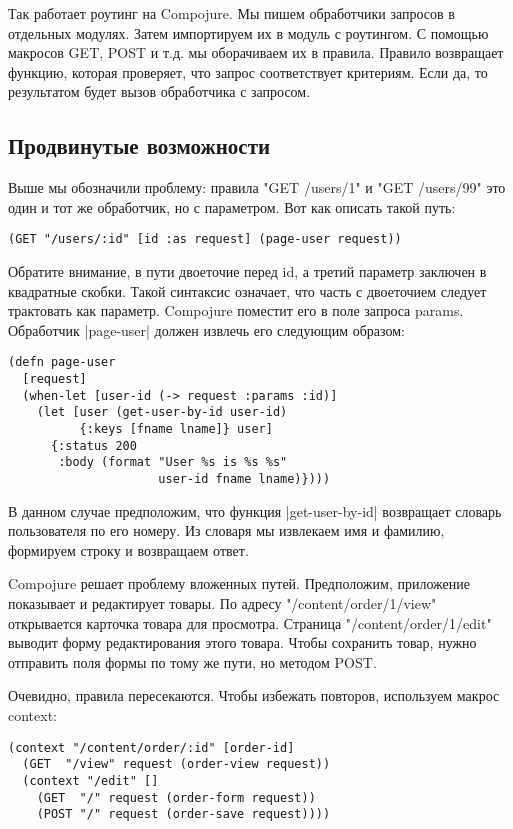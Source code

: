 Так работает роутинг на Compojure. Мы пишем обработчики запросов в отдельных
модулях. Затем импортируем их в модуль с роутингом. С помощью макросов GET, POST
и т.д. мы оборачиваем их в правила. Правило возвращает функцию, которая
проверяет, что запрос соответствует критериям. Если да, то результатом будет
вызов обработчика с запросом.

\subsection{Продвинутые возможности}

Выше мы обозначили проблему: правила "GET /users/1" и "GET /users/99" это один и
тот же обработчик, но с параметром. Вот как описать такой путь:

\begin{verbatim}
(GET "/users/:id" [id :as request] (page-user request))
\end{verbatim}

Обратите внимание, в пути двоеточие перед id, а третий параметр заключен в
квадратные скобки. Такой синтаксис означает, что часть с двоеточием следует
трактовать как параметр. Compojure поместит его в поле запроса
params. Обработчик \spverb|page-user| должен извлечь его следующим образом:

\begin{verbatim}
(defn page-user
  [request]
  (when-let [user-id (-> request :params :id)]
    (let [user (get-user-by-id user-id)
          {:keys [fname lname]} user]
      {:status 200
       :body (format "User %s is %s %s"
                     user-id fname lname)})))
\end{verbatim}

В данном случае предположим, что функция \spverb|get-user-by-id| возвращает словарь
пользователя по его номеру. Из словаря мы извлекаем имя и фамилию, формируем
строку и возвращаем ответ.

Compojure решает проблему вложенных путей. Предположим, приложение показывает и
редактирует товары. По адресу "/content/order/1/view" открывается карточка
товара для просмотра. Страница "/content/order/1/edit" выводит форму
редактирования этого товара. Чтобы сохранить товар, нужно отправить поля формы
по тому же пути, но методом POST.

Очевидно, правила пересекаются. Чтобы избежать повторов, используем макрос context:

\begin{verbatim}
(context "/content/order/:id" [order-id]
  (GET  "/view" request (order-view request))
  (context "/edit" []
    (GET  "/" request (order-form request))
    (POST "/" request (order-save request))))
\end{verbatim}

